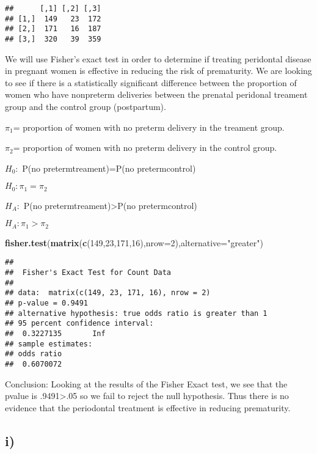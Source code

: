 \documentclass[]{article}
\newenvironment{Shaded}{\begin{snugshade}}{\end{snugshade}}
\newcommand{\KeywordTok}[1]{\textcolor[rgb]{0.13,0.29,0.53}{\textbf{#1}}}
\newcommand{\DataTypeTok}[1]{\textcolor[rgb]{0.13,0.29,0.53}{#1}}
\newcommand{\DecValTok}[1]{\textcolor[rgb]{0.00,0.00,0.81}{#1}}
\newcommand{\StringTok}[1]{\textcolor[rgb]{0.31,0.60,0.02}{#1}}
\newcommand{\NormalTok}[1]{#1}
\begin{document}
\begin{verbatim}
##      [,1] [,2] [,3]
## [1,]  149   23  172
## [2,]  171   16  187
## [3,]  320   39  359
\end{verbatim}

We will use Fisher's exact test in order to determine if treating
peridontal disease in pregnant women is effective in reducing the risk
of prematurity. We are looking to see if there is a statistically
significant difference between the proportion of women who have
nonpreterm deliveries between the prenatal peridonal treament group and
the control group (postpartum).

\(\pi_1\)= proportion of women with no preterm delivery in the treament
group.

\(\pi_2\)= proportion of women with no preterm delivery in the control
group.

\(H_0:\) P(no preterm\textbar{}treament)=P(no preterm\textbar{}control)

\(H_0: \pi_1=\pi_2\)

\(H_A:\) P(no preterm\textbar{}treament)\textgreater{}P(no
preterm\textbar{}control)

\(H_A: \pi_1>\pi_2\)

\begin{Shaded}
\begin{Highlighting}[]
\KeywordTok{fisher.test}\NormalTok{(}\KeywordTok{matrix}\NormalTok{(}\KeywordTok{c}\NormalTok{(}\DecValTok{149}\NormalTok{,}\DecValTok{23}\NormalTok{,}\DecValTok{171}\NormalTok{,}\DecValTok{16}\NormalTok{),}\DataTypeTok{nrow=}\DecValTok{2}\NormalTok{),}\DataTypeTok{alternative=}\StringTok{"greater"}\NormalTok{)}
\end{Highlighting}
\end{Shaded}

\begin{verbatim}
## 
##  Fisher's Exact Test for Count Data
## 
## data:  matrix(c(149, 23, 171, 16), nrow = 2)
## p-value = 0.9491
## alternative hypothesis: true odds ratio is greater than 1
## 95 percent confidence interval:
##  0.3227135       Inf
## sample estimates:
## odds ratio 
##  0.6070072
\end{verbatim}

Conclusion: Looking at the results of the Fisher Exact test, we see that
the pvalue is .9491\textgreater{}.05 so we fail to reject the null
hypothesis. Thus there is no evidence that the periodontal treatment is
effective in reducing prematurity.

\subsection{i)}\label{i}
\end{document}
